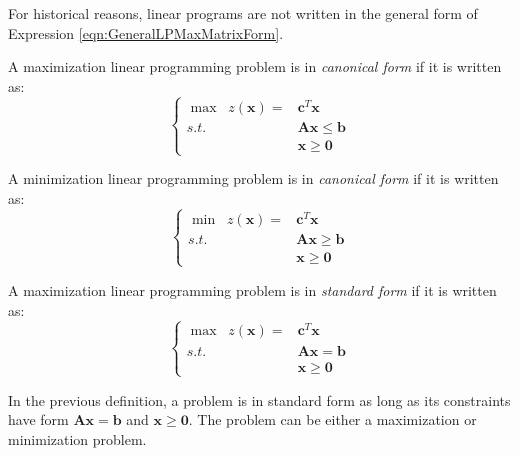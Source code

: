 For historical reasons, linear programs are not written in the general form of Expression \ref{eqn:GeneralLPMaxMatrixForm}. 

\begin{definition}  A maximization linear programming problem is in \textit{canonical form} if it is written as:
\begin{equation}
\left\{
\begin{aligned}
\max\;\; z(\mathbf{x}) = &\mathbf{c}^T\mathbf{x}\\
s.t.\;\;&\mathbf{A}\mathbf{x} \leq \mathbf{b}\\
& \mathbf{x} \geq \mathbf{0}
\end{aligned}\right.
\label{eqn:CanonicalFormMax}
\end{equation}

A minimization linear programming problem is in \textit{canonical form} if it is written as:
\begin{equation}
\left\{
\begin{aligned}
\min\;\; z(\mathbf{x}) = &\mathbf{c}^T\mathbf{x}\\
s.t.\;\;&\mathbf{A}\mathbf{x} \geq \mathbf{b}\\
& \mathbf{x} \geq \mathbf{0}
\end{aligned}\right.
\label{eqn:MinCanonicalFormMax}
\end{equation}
\end{definition}

\begin{definition}  A maximization linear programming problem is in \textit{standard form} if it is written as:
\begin{equation}
\left\{
\begin{aligned}
\max\;\; z(\mathbf{x}) = &\mathbf{c}^T\mathbf{x}\\
s.t.\;\;&\mathbf{A}\mathbf{x} = \mathbf{b}\\
& \mathbf{x} \geq \mathbf{0}
\end{aligned}\right.
\label{eqn:StandardFormMax}
\end{equation}
\end{definition}

\begin{remark} In the previous definition, a problem is in standard form as long as its constraints have form $\mathbf{A}\mathbf{x} = \mathbf{b}$ and $\mathbf{x} \geq \mathbf{0}$. The problem can be either a maximization or minimization problem.
\end{remark}


